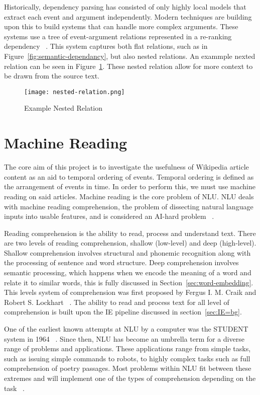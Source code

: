\documentclass[bsc,frontabs,twoside,singlespacing,parskip,deptreport]{infthesis}     %
\begin{document}
Historically, dependency parsing has consisted of only highly local models that extract each event and argument independently.
Modern techniques are building upon this to build systems that can handle more complex arguments. These systems use a tree of
event-argument relations represented in a re-ranking dependency ~\cite{mcclosky2011event}.
This system captures both flat relations, such as in Figure~\ref{fig:semantic-dependancy}, but also nested relations.
An exammple nexted relation can be seen in Figure~\ref{fig:nested-relation}. These nested relation allow for more context to be drawn from
the source text.


\begin{figure}[H]
  \centering
  \texttt{[image: nested-relation.png]}
  \caption{Example Nested Relation}
  \label{fig:nested-relation}
\end{figure}


\section{Machine Reading}
The core aim of this project is to investigate the usefulness of Wikipedia article content as an aid to temporal ordering of events.
Temporal ordering is defined as the arrangement of events in time.
In order to perform this, we must use machine reading on said articles.
Machine reading is the core problem of NLU.
NLU deals with machine reading comprehension, the problem of dissecting natural language inputs into usable features,
and is considered an AI-hard problem ~\cite{}.

Reading comprehension is the ability to read, process and understand text.  
There are two levels of reading comprehension, shallow (low-level) and deep (high-level).
Shallow comprehension involves structural and phonemic recognition along with the processing of sentence and  word
structure.
Deep comprehension involves semantic processing, which happens when we encode the meaning of a word and relate it
to similar words, this is fully discussed in Section~\ref{sec:word-embedding}.
This levels system of comprehension was first proposed by  Fergus I. M. Craik and Robert S. Lockhart ~\cite{wagner2009beyond}.
The ability to read and process text for all level of comprehension is built upon the IE pipeline discussed in section~\ref{sec:IE=bg}.

One of the earliest known attempts at NLU by a computer was the STUDENT system in 1964 ~\cite{russell1995modern}.
Since then, NLU has become an
umbrella term for a diverse range of problems and applications. These applications range from simple tasks, such as
issuing simple commands to robots, to highly complex tasks such as full comprehension of poetry passages.
Most problems within NLU fit between these extremes and will implement one of the types of comprehension
depending on the task ~\cite{}.
\end{document}
